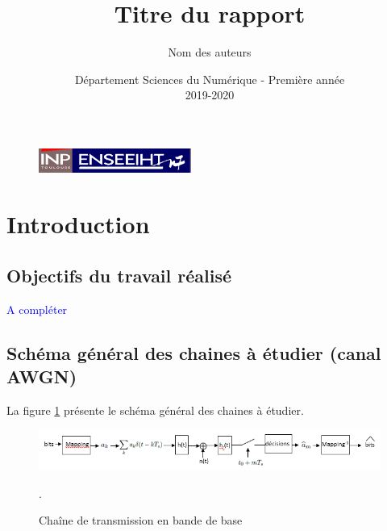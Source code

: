 \documentclass{article}
\begin{document}
\begin{figure}[t]
\centering
\includegraphics[width=5cm]{inp_n7.png}
\end{figure}

\title{\vspace{4cm} \textbf{Titre du rapport}}
\author{Nom des auteurs\\ }
\date{\vspace{7cm} Département Sciences du Numérique - Première année \\
2019-2020 }

\maketitle

\newpage
\tableofcontents
\listoffigures

\newpage
\section{Introduction}
\subsection{Objectifs du travail réalisé}
\textcolor{blue}{A compléter}

\subsection{Schéma général des chaines à étudier (canal AWGN)}
La figure \ref{chaine_ex1} présente le schéma général des chaines à étudier.

\begin{figure}[ht!]
\centering
\includegraphics[width=15cm]{figure1.png}
\caption{Chaîne de transmission en bande de base}.
\label{chaine_ex1}
\end{figure}
\end{document}

